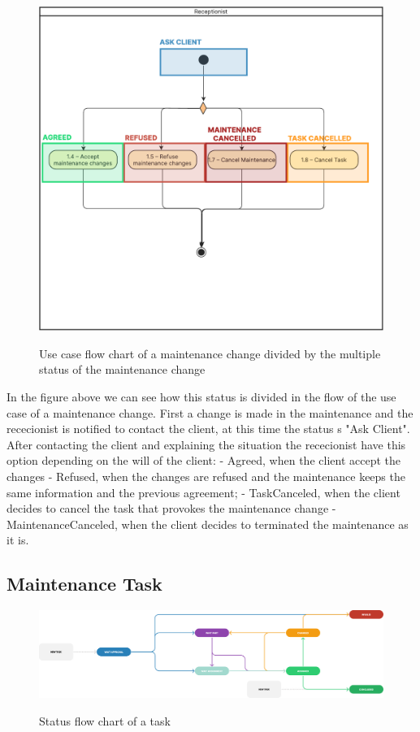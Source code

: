 \begin{figure}[h]
  \caption{Use case flow chart of a maintenance change divided by the multiple status of the maintenance change}
  \centering
  \includegraphics[width=\textwidth]{figs/Status/MaintenanceChange/UseCaseStatus}
  \label{fig:figure2}
\end{figure}

In the figure above we can see how this status is divided in the flow of the use case of a maintenance change.
First a change is made in the maintenance and the rececionist is notified to contact the client, at this time the status s "Ask Client".
After contacting the client and explaining the situation the rececionist have this option depending on the will of the client:
- Agreed, when the client accept the changes
- Refused, when the changes are refused and the maintenance keeps the same information and the previous agreement; 
- TaskCanceled, when the client decides to cancel the task that provokes the maintenance change
- MaintenanceCanceled, when the client decides to terminated the maintenance as it is.

\subsection{Maintenance Task} 


\begin{figure}[h]
  \caption{Status flow chart of a task}
  \centering
  \includegraphics[width=\textwidth]{figs/Status/MaintenanceTask/StatusDiagram}
  \label{fig:figure2}
\end{figure}


